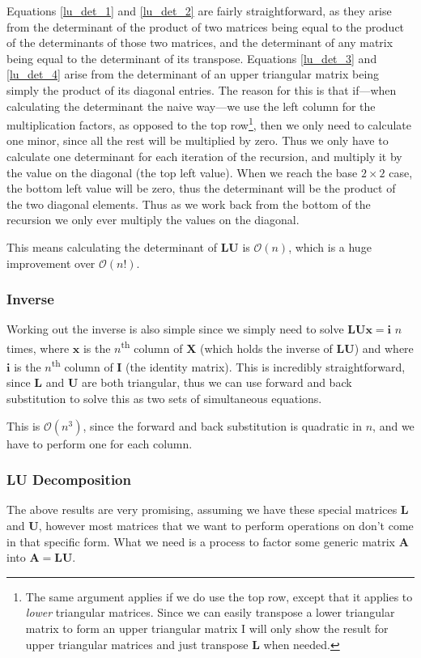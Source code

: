 \documentclass[12pt]{article}
\begin{document}
Equations \ref{lu_det_1} and \ref{lu_det_2} are fairly straightforward, as they arise from the determinant of the product of two matrices being equal to the product of the determinants of those two matrices, and the determinant of any matrix being equal to the determinant of its transpose. Equations \ref{lu_det_3} and \ref{lu_det_4}
arise from the determinant of an upper triangular matrix being simply the product of its diagonal entries. The reason for this is that if---when calculating the determinant the naive way---we use the left column for the multiplication factors, as opposed to the top row\footnote{The same argument applies if we do use the top row, except that it applies to \emph{lower} triangular matrices. Since we can easily transpose a lower triangular matrix to form an upper triangular matrix I will only show the result for upper triangular matrices and just transpose $\mathbf{L}$ when needed.}, then we only need to calculate one minor, since all the rest will be multiplied by zero. Thus we only have to calculate one determinant for each iteration of the recursion, and multiply it by the value on the diagonal (the top left value). When we reach the base $2\times2$ case, the bottom left value will be zero, thus the determinant will be the product of the two diagonal elements. Thus as we work back from the bottom of the recursion we only ever multiply the values on the diagonal.

This means calculating the determinant of $\mathbf{LU}$ is $\mathcal{O}(n)$\cite{GoluVanl96}, which is a huge improvement over $\mathcal{O}(n!)$.

\subsubsection{Inverse}
Working out the inverse is also simple since we simply need to solve $\mathbf{LUx}=\mathbf{i}$ $n$ times, where $\mathbf{x}$ is the $n$\textsuperscript{th} column of $\mathbf{X}$ (which holds the inverse of $\mathbf{LU}$) and where $\mathbf{i}$ is the $n$\textsuperscript{th} column of $\mathbf{I}$ (the identity matrix). This is incredibly straightforward, since $\mathbf{L}$ and $\mathbf{U}$ are both triangular, thus we can use forward and back substitution to solve this as two sets of simultaneous equations.

This is $\mathcal{O}(n^3)$, since the forward and back substitution is quadratic in $n$, and we have to perform one for each column.

\subsubsection{LU Decomposition}
The above results are very promising, assuming we have these special matrices $\mathbf{L}$ and $\mathbf{U}$, however most matrices that we want to perform operations on don't come in that specific form. What we need is a process to factor some generic matrix $\mathbf{A}$ into $\mathbf{A}=\mathbf{LU}$.
\end{document}
